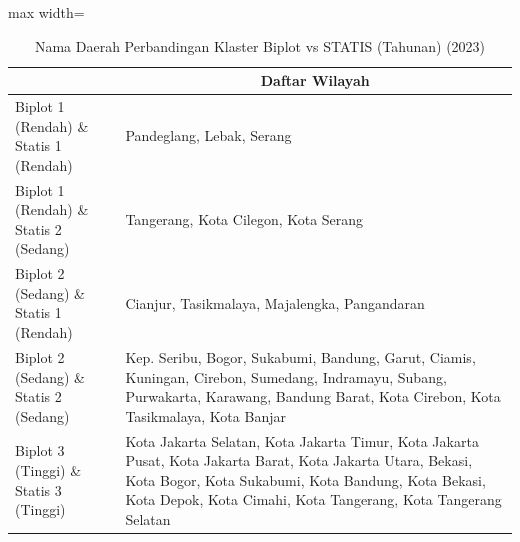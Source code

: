 \begin{table}[H]
\centering
\caption{Nama Daerah Perbandingan Klaster Biplot vs STATIS (Tahunan) (2023)} \label{tab:app1biplot_statis_comp_name_2023}
\begin{adjustbox}{max width=\textwidth}
\begin{tabular}{|>{\centering\arraybackslash}p{4cm}|p{10cm}|}
\hline
\multicolumn{1}{|c|}{\textbf{Kategori}} & \multicolumn{1}{c|}{\textbf{Daftar Wilayah}} \\
\hline
Biplot 1 (Rendah) \& Statis 1 (Rendah) & Pandeglang, Lebak, Serang \\
\hline
Biplot 1 (Rendah) \& Statis 2 (Sedang) & Tangerang, Kota Cilegon, Kota Serang \\
\hline
Biplot 2 (Sedang) \& Statis 1 (Rendah) & Cianjur, Tasikmalaya, Majalengka, Pangandaran \\
\hline
Biplot 2 (Sedang) \& Statis 2 (Sedang) & Kep. Seribu, Bogor, Sukabumi, Bandung, Garut, Ciamis, Kuningan, Cirebon, Sumedang, Indramayu, Subang, Purwakarta, Karawang, Bandung Barat, Kota Cirebon, Kota Tasikmalaya, Kota Banjar \\
\hline
Biplot 3 (Tinggi) \& Statis 3 (Tinggi) & Kota Jakarta Selatan, Kota Jakarta Timur, Kota Jakarta Pusat, Kota Jakarta Barat, Kota Jakarta Utara, Bekasi, Kota Bogor, Kota Sukabumi, Kota Bandung, Kota Bekasi, Kota Depok, Kota Cimahi, Kota Tangerang, Kota Tangerang Selatan \\
\hline
\end{tabular}
\end{adjustbox}
\end{table}